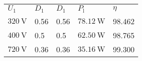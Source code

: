 \begin{table}[ht]
    \centering  %
    \begin{tabular}{lllll}
        \toprule
        
        $U_\mathrm{1}$ & $D_1$   &  $D_1$ & $P_\mathrm{l}$      & $\eta$ \\ 
        $\SI{320}{\volt}$ & 0.56 &  0.56  & $\SI{78.12}{\watt}$ & 98.462 \\ 
        $\SI{400}{\volt}$ & 0.5  &  0.5   & $\SI{62.50}{\watt}$ & 98.765 \\ 
        $\SI{720}{\volt}$ & 0.36 &  0.36  & $\SI{35.16}{\watt}$ & 99.300 \\ 
        \bottomrule
    \end{tabular}
\end{table}